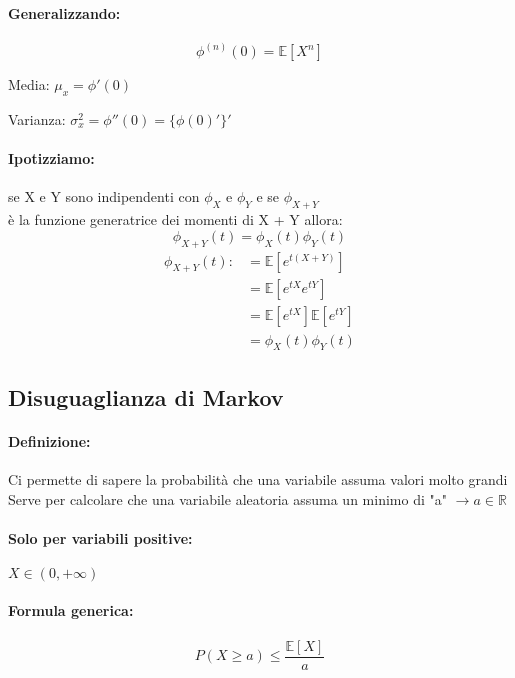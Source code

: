 \documentclass[]{article}
\newcommand{\ev}{\mathbb{E}[X]}
\renewcommand{\ev}[1]{\mathbb{E}[#1]}
\newcommand{\definizione}{\paragraph{Definizione:}}
\newcommand{\formula}{\paragraph{Formula generica:}}
\begin{document}
    \paragraph{Generalizzando:} \[ \phi^{(n)}(0) = \ev{X^n} \]
    \begin{minipage}{0.45\linewidth}
        Media:
        $ \mu_x = \phi'(0) $
    \end{minipage}
    \begin{minipage}{0.45\linewidth}
        Varianza:
        $ \sigma^{2}_x = \phi''(0) = \{\phi(0)'\}' $
    \end{minipage}

    \paragraph{Ipotizziamo:} se X e Y sono indipendenti con $\phi_X$ e $\phi_Y$ e se $\phi_{X + Y}$ \\
    è la funzione generatrice dei momenti di X + Y allora:
    \[ \phi_{X + Y}(t) = \phi_X(t) \phi_Y(t) \]
    \begin{equation*}
        \begin{split}
            \phi_{X + Y}(t) :&= \ev{e^{t(X + Y)}} \\
            & = \ev{e^{tX} e^{tY}} \\
            & = \ev{e^{tX}} \ev{e^{tY}} \\
            & = \phi_X(t) \phi_Y(t)
        \end{split}
    \end{equation*}
    \subsection{Disuguaglianza di Markov}
    \definizione Ci permette di sapere la probabilità che una variabile assuma valori molto grandi \\
    Serve per calcolare che una variabile aleatoria assuma un minimo di "a" $\longrightarrow a \in \mathbb{R}$

    \paragraph{Solo per variabili positive:} $X \in (0, +\infty) $
    \formula \[ P(X \geq a) \leq \frac{\ev{X}}{a}\]
\end{document}
